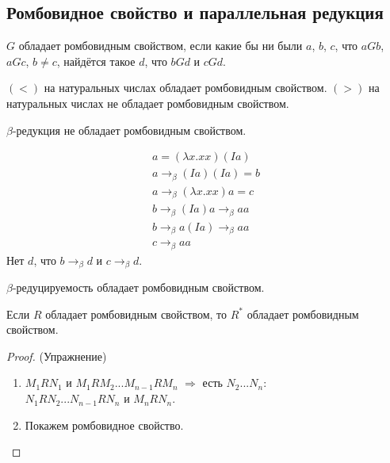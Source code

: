 \subsection{\texorpdfstring{Ромбовидное свойство и параллельная редукция}{Diamond property and parallel reduction}}

\begin{definition}
    $G$ обладает ромбовидным свойством, если какие бы ни были $a$, $b$, $c$, что $aGb$, $aGc$, $b \ne c$, найдётся такое $d$, что $bGd$ и $cGd$.
\end{definition}

\begin{example}
    $(<)$ на натуральных числах обладает ромбовидным свойством.
    $(>)$ на натуральных числах не обладает ромбовидным свойством.
\end{example}

$\beta$-редукция не обладает ромбовидным свойством.
\begin{example} %
    \begin{gather*}
        a = (\lambda x . x x)(Ia) \\
        a \rightarrow_{\beta} (Ia)(Ia) = b\\
        a \rightarrow_{\beta} (\lambda x . x x) a = c \\
        b \rightarrow_{\beta} (Ia)a \rightarrow_{\beta} aa \\
        b \rightarrow_{\beta} a(Ia) \rightarrow_{\beta} aa \\
        c \rightarrow_{\beta} aa
    \end{gather*}
    Нет $d$, что $b \rightarrow_{\beta} d$ и $c \rightarrow_{\beta} d$.
\end{example}

\begin{theorem} \label{church-rosser}
    $\beta$-редуцируемость обладает ромбовидным свойством.
\end{theorem}

\begin{lemma}
    Если $R$ обладает ромбовидным свойством, то $R^{*}$ обладает ромбовидным свойством.
\end{lemma}

\begin{proof} (Упражнение) \todo %
    \begin{enumerate}
        \item $M_{1}RN_{1}$ и $M_{1}RM_{2}...M_{n-1}RM_{n}$ $\Rightarrow$ есть $N_{2}...N_{n}$: \\
            $N_{1}RN_{2}...N_{n-1}RN_{n}$ и $M_{n}RN_{n}$.
        \item Покажем ромбовидное свойство.
        \qedhere
    \end{enumerate}
\end{proof}

